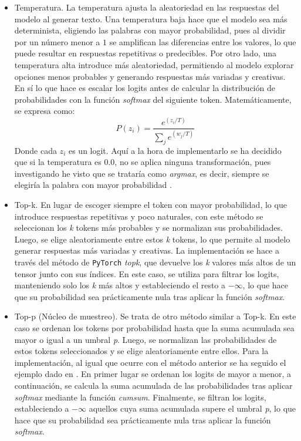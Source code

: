 \documentclass[11pt]{book}
\theoremstyle{plain}
\theoremstyle{definition}
\begin{document}
\begin{itemize}
    \item Temperatura.
La temperatura ajusta la aleatoriedad en las respuestas del modelo al generar texto. Una temperatura baja hace que el modelo sea más determinista, eligiendo las palabras con mayor probabilidad, pues al dividir por un número menor a $1$ se amplifican las diferencias entre los valores, lo que puede resultar en respuestas repetitivas o predecibles. Por otro lado, una temperatura alta introduce más aleatoriedad, permitiendo al modelo explorar opciones menos probables y generando respuestas más variadas y creativas. En sí lo que hace es escalar los logits antes de calcular la distribución de probabilidades con la función \textit{softmax} del siguiente token. Matemáticamente, se expresa como:
    \[
        P(z_i) = \frac{e^{(z_i / T)}}{\sum_{j} e^{(w_j/ T)}}
    \]
Donde cada $z_i$ es un logit. Aquí a la hora de implementarlo se ha decidido que si la temperatura es $0.0$, no se aplica ninguna transformación, pues investigando he visto que se trataría como \textit{argmax}, es decir, siempre se elegiría la palabra con mayor probabilidad \parencite{vishnuraj2025temperature}.

    \item Top-k.
En lugar de escoger siempre el token con mayor probabilidad, lo que introduce respuestas repetitivas y poco naturales, con este método se seleccionan los \textit{k} tokens más probables y se normalizan sus probabilidades. Luego, se elige aleatoriamente entre estos \textit{k} tokens, lo que permite al modelo generar respuestas más variadas y creativas. La implementación se hace a través del método de \texttt{PyTorch} \textit{topk}, que devuelve los \textit{k} valores más altos de un tensor junto con sus índices. En este caso, se utiliza para filtrar los logits, manteniendo solo los \textit{k} más altos y estableciendo el resto a $-\infty$, lo que hace que su probabilidad sea prácticamente nula tras aplicar la función \textit{softmax}.

    \item Top-p (Núcleo de muestreo).
Se trata de otro método similar a Top-k. En este caso se ordenan los tokens por probabilidad hasta que la suma acumulada sea mayor o igual a un umbral \textit{p}. Luego, se normalizan las probabilidades de estos tokens seleccionados y se elige aleatoriamente entre ellos. Para la implementación, al igual que ocurre con el método anterior se ha seguido el ejemplo dado en \parencite{bsantraigi_topk_topp_batched}. En primer lugar se ordenan los logits de mayor a menor, a continuación, se calcula la suma acumulada de las probabilidades tras aplicar \textit{softmax} mediante la función \textit{cumsum}. Finalmente, se filtran los logits, estableciendo a $-\infty$ aquellos cuya suma acumulada supere el umbral \textit{p}, lo que hace que su probabilidad sea prácticamente nula tras aplicar la función \textit{softmax}.


\end{itemize}
\end{document}
